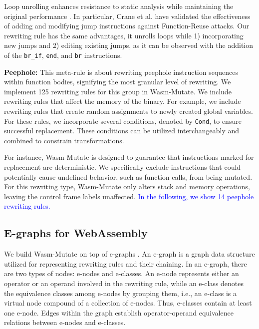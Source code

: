 \documentclass[a4paper,fleqn]{cas-dc}
\newcommand*\badge[1]{ \colorbox{red}{\color{white}#1}}
\newcommand{\tool}{{\sc Wasm-Mutate}\xspace}
\newenvironment{revision1}{\color{blue}}{}
\newcommand{\revision}[1]{\textcolor{blue}{#1}}
\newcommand{\todo}[1]{%
\refstepcounter{todo}
\noindent\textbf{\badge{TODO}} {\color{red}#1}
\addcontentsline{td}{todo}
{\color{red}\thesection.\thetodo\xspace #1}}
\begin{document}
Loop unrolling enhances resistance to static analysis while maintaining the original performance \cite{10.1145/3453483.3454035}. 
In particular, Crane et al. \cite{10.1145/2810103.2813682} have validated the effectiveness of adding and modifying jump instructions against Function-Reuse attacks.
Our rewriting rule has the same advantages, it unrolls loops while 1) incorporating new jumps and 2) editing existing jumps, as it can be observed with the addition of the \texttt{br_if}, \texttt{end}, and \texttt{br} instructions. 



\textbf{Peephole:} 
This meta-rule is about rewriting peephole instruction sequences within function bodies, signifying the most granular level of rewriting. 
We implement 125 rewriting rules for this group in \tool. 
We include rewriting rules that affect the memory of the binary.
For example, we include rewriting rules that create random assignments to newly created global variables.
For these rules, we incorporate several conditions, denoted by \texttt{Cond}, to ensure successful replacement. 
These conditions can be utilized interchangeably and combined to constrain transformations.

For instance, \tool is designed to guarantee that instructions marked for replacement are deterministic. 
We specifically exclude instructions that could potentially cause undefined behavior, such as function calls, from being mutated. 
For this rewriting type, \tool only alters stack and memory operations, leaving the control frame labels unaffected.
\revision{In the following, we show 14 peephole rewriting rules.}

\begin{revision1}
    
    
    
\end{revision1}



\subsection{E-graphs for WebAssembly}
\label{alg}

We build \tool on top of e-graphs \cite{10.1145/3571207}.
An e-graph is a graph data structure utilized for representing rewriting rules and their chaining. 
In an e-graph, there are two types of nodes: e-nodes and e-classes. 
An e-node represents either an operator or an operand involved in the rewriting rule, while an e-class denotes the equivalence classes among e-nodes by grouping them, i.e., an e-class is a virtual node compound of a collection of e-nodes. 
Thus, e-classes contain at least one e-node.
Edges within the graph establish operator-operand equivalence relations between e-nodes and e-classes.
\end{document}
